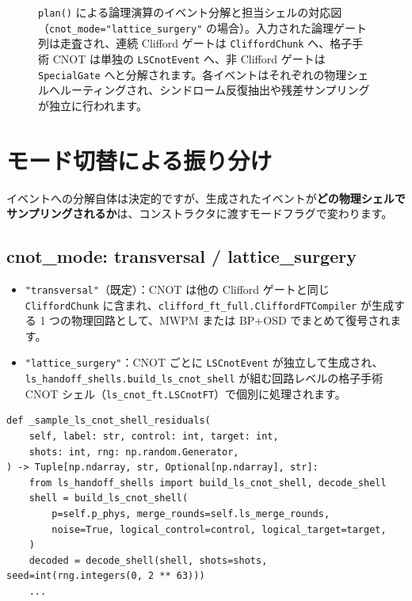 \begin{figure}[htbp]
  \caption{\texttt{plan()} による論理演算のイベント分解と担当シェルの対応図（\texttt{cnot\_mode="lattice\_surgery"} の場合）。入力された論理ゲート列は走査され、連続 Clifford ゲートは \texttt{CliffordChunk} へ、格子手術 CNOT は単独の \texttt{LSCnotEvent} へ、非 Clifford ゲートは \texttt{SpecialGate} へと分解されます。各イベントはそれぞれの物理シェルへルーティングされ、シンドローム反復抽出や残差サンプリングが独立に行われます。}
  \label{fig:ch21_plan_decomposition}
\end{figure}

\section{モード切替による振り分け}\label{sec:modes}

イベントへの分解自体は決定的ですが、生成されたイベントが\textbf{どの物理シェルでサンプリングされるか}は、コンストラクタに渡すモードフラグで変わります。

\subsection{cnot\_mode: transversal / lattice\_surgery}

\begin{itemize}
  \item \texttt{"transversal"}（既定）：CNOT は他の Clifford ゲートと同じ \texttt{CliffordChunk} に含まれ、\texttt{clifford\_ft\_full.CliffordFTCompiler} が生成する 1 つの物理回路として、MWPM または BP+OSD でまとめて復号されます。
  \item \texttt{"lattice\_surgery"}：CNOT ごとに \texttt{LSCnotEvent} が独立して生成され、\texttt{ls\_handoff\_shells.build\_ls\_cnot\_shell} が組む回路レベルの格子手術 CNOT シェル（\texttt{ls\_cnot\_ft.LSCnotFT}）で個別に処理されます。
\end{itemize}

\begin{lstlisting}[caption={LSCnotEvent のサンプリング呼び出し（src/ftqc/hybrid\_ftqc\_runtime.py）}]
def _sample_ls_cnot_shell_residuals(
    self, label: str, control: int, target: int,
    shots: int, rng: np.random.Generator,
) -> Tuple[np.ndarray, str, Optional[np.ndarray], str]:
    from ls_handoff_shells import build_ls_cnot_shell, decode_shell
    shell = build_ls_cnot_shell(
        p=self.p_phys, merge_rounds=self.ls_merge_rounds,
        noise=True, logical_control=control, logical_target=target,
    )
    decoded = decode_shell(shell, shots=shots, seed=int(rng.integers(0, 2 ** 63)))
    ...
\end{lstlisting}

